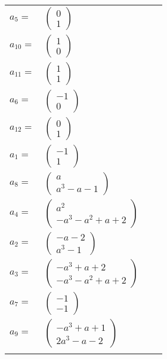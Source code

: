 \documentclass[1p]{elsarticle_modified}
\theoremstyle{definition}
\begin{document}
\begin{tabular}{m{7pt} m{180pt} m{7pt} m{180pt} }
\flushright $a_{5}=$&$\begin{pmatrix}0\\1\end{pmatrix}$ \\
\flushright $a_{10}=$&$\begin{pmatrix}1\\0\end{pmatrix}$ \\
\flushright $a_{11}=$&$\begin{pmatrix}1\\1\end{pmatrix}$ \\
\flushright $a_{6}=$&$\begin{pmatrix}-1\\0\end{pmatrix}$ \\
\flushright $a_{12}=$&$\begin{pmatrix}0\\1\end{pmatrix}$ \\
\flushright $a_{1}=$&$\begin{pmatrix}-1\\1\end{pmatrix}$ \\
\flushright $a_{8}=$&$\begin{pmatrix}a\\a^3- a-1\end{pmatrix}$ \\
\flushright $a_{4}=$&$\begin{pmatrix}a^2\\- a^3- a^2+a+2\end{pmatrix}$ \\
\flushright $a_{2}=$&$\begin{pmatrix}- a-2\\a^3-1\end{pmatrix}$ \\
\flushright $a_{3}=$&$\begin{pmatrix}- a^3+a+2\\- a^3- a^2+a+2\end{pmatrix}$ \\
\flushright $a_{7}=$&$\begin{pmatrix}-1\\-1\end{pmatrix}$ \\
\flushright $a_{9}=$&$\begin{pmatrix}- a^3+a+1\\2 a^3- a-2\end{pmatrix}$\\&\end{tabular}
\end{document}
